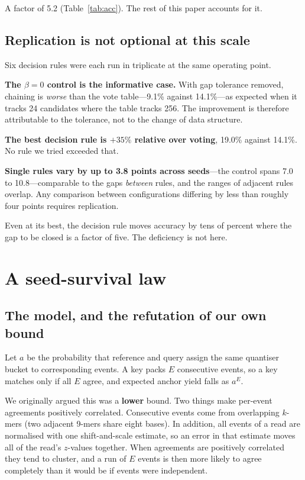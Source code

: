 \documentclass[runningheads]{llncs}
\begin{document}
A factor of 5.2 (Table~\ref{tab:acc}). The rest of this paper accounts for it.

\subsection{Replication is not optional at this scale}

Six decision rules were each run in triplicate at the same operating point.

\textbf{The $\beta = 0$ control is the informative case.} With gap tolerance removed, chaining is
\emph{worse} than the vote table---9.1\% against 14.1\%---as expected when it tracks 24
candidates where the table tracks 256. The improvement is therefore attributable to the
tolerance, not to the change of data structure.

\textbf{The best decision rule is $+35\%$ relative over voting}, 19.0\% against 14.1\%. No rule
we tried exceeded that.

\textbf{Single rules vary by up to 3.8 points across seeds}---the control spans 7.0 to
10.8---comparable to the gaps \emph{between} rules, and the ranges of adjacent rules overlap. Any
comparison between configurations differing by less than roughly four points requires
replication.

Even at its best, the decision rule moves accuracy by tens of percent where the gap to be closed
is a factor of five. The deficiency is not here.

\section{A seed-survival law}
\label{sec:law}

\subsection{The model, and the refutation of our own bound}

Let $a$ be the probability that reference and query assign the same quantiser bucket to
corresponding events. A key packs $E$ consecutive events, so a key matches only if all $E$
agree, and expected anchor yield falls as $a^{E}$.

We originally argued this was a \textbf{lower} bound. Two things make per-event agreements
positively correlated. Consecutive events come from overlapping $k$-mers (two adjacent 9-mers
share eight bases). In addition, all events of a read are normalised with one shift-and-scale
estimate, so an error in that estimate moves all of the read's $z$-values together. When
agreements are positively correlated they tend to cluster, and a run of $E$ events is then more
likely to agree completely than it would be if events were independent.
\end{document}
